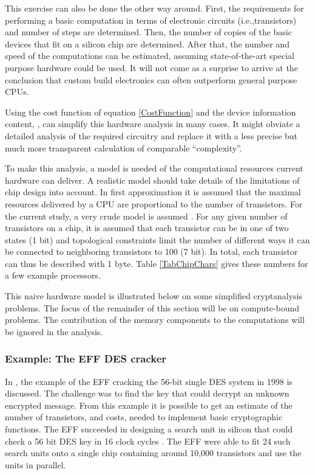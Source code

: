 \documentclass{article}
\begin{document}
This exercise can also be done the other way around. 
First, the requirements for performing a basic computation in terms of electronic
circuits (i.e.,transistors) and number of steps are determined. Then, the
number of copies of the basic devices that fit on a silicon chip are determined.  After that,
the number and speed of the computations can be estimated, assuming 
state-of-the-art special purpose hardware could be used. It will not come as a surprise
to arrive at the conclusion that custom build electronics can often outperform
general purpose CPUs. 

Using the cost function of equation \ref{CostFunction}
and the device information content, , can simplify this 
hardware analysis in many cases. It might obviate a
detailed analysis of the required circuitry and replace it with a less precise
but much more transparent calculation of comparable ``complexity''.

To make this analysis, a model is needed of the computational resources current hardware 
can deliver. A realistic model should take details of the limitations of chip design into 
account. In first approximation it is assumed that the maximal resources delivered by a CPU 
are proportional to the number of transistors. For the current study, a very crude model is assumed 
\cite{Son0911-5262}. For any given number of transistors on a chip, it is assumed that each 
transistor can be in one of two states (1 bit) and topological constraints limit the number of
different ways it can be connected to neighboring transistors to 100 (7 bit). In total, 
each transistor can thus be described with 1 byte.  Table \ref{TabChipChars} gives these numbers
for a few example processors.

This naive hardware model is illustrated below on some simplified cryptanalysis problems. 
The focus of the remainder of this section will be on compute-bound problems. The 
contribution of the memory components to the computations will be ignored in the analysis.

\subsubsection{Example: The EFF DES cracker}\label{SectEFFDESS}

In \cite{Son0911-5262}, the example of the EFF cracking the 56-bit single DES system in 
1998 \cite{EFF-DES,DEScracker:1998} is discussed. The challenge was to find the key that
could decrypt an unknown encrypted message.
From this example it is possible to get an
estimate of the number of transistors, and costs, needed to implement basic cryptographic
functions. The EFF succeeded in designing a search unit in silicon that could check 
a 56 bit DES key in 16 clock cycles \cite{EFF-DES,DEScracker:1998}. The EFF were able to fit 24 
such search units onto a single chip containing around 10,000 transistors and use 
the units in parallel. 
\end{document}
